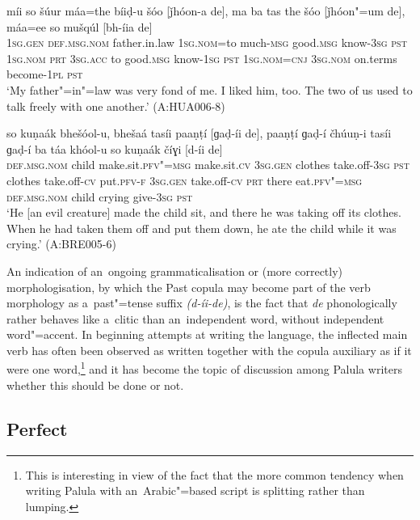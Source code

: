\begin{exe}
\ex
\label{ex:9-20}
\gll míi so šúur máa=the bíiḍ-u šóo [ǰhóon-a de], ma ba tas the šóo [ǰhóon"=um de], máa=ee so mušqúl [bh-íia de] \\
\textsc{1sg.gen} \textsc{def.msg.nom} father.in.law \textsc{1sg.nom=}to much-\textsc{msg} good.\textsc{msg} know-\textsc{3sg} \textsc{pst} \textsc{1sg.nom} \textsc{prt} \textsc{3sg.acc}  to good.\textsc{msg} know-\textsc{1sg } \textsc{pst } \textsc{1sg.nom=cnj}  \textsc{3sg.nom} on.terms become-\textsc{1pl} \textsc{pst} \\
\glt `My father"=in"=law was very fond of me. I liked him, too. The two of us used to talk freely with one another.' (A:HUA006-8)

\ex
\label{ex:9-21}
\gll so kuṇaák bhešóol-u, bhešaá tasíi paaṇṭí [ɡaḍ-íi de], paaṇṭí ɡaḍ-í čhúuṇ-i tasíi ɡaḍ-í ba táa khóol-u so kuṇaák číɣi [d-íi de] \\
\textsc{def.msg.nom} child make.sit.\textsc{pfv"=msg} make.sit.\textsc{cv} \textsc{3sg.gen}  clothes take.off-\textsc{3sg } \textsc{pst} clothes take.off-\textsc{cv} put.\textsc{pfv-f}  \textsc{3sg.gen} take.off-\textsc{cv} \textsc{prt} there eat.\textsc{pfv"=msg}  \textsc{def.msg.nom} child crying give-\textsc{3sg} \textsc{pst} \\
\glt `He [an evil creature] made the child sit, and there he was taking off its clothes. When he had taken them off and put them down, he ate the child while it was crying.' (A:BRE005-6)
\end{exe}

An indication of an~ongoing grammaticalisation or (more correctly) morphologisation, by which the Past copula may become part of the verb morphology as a~past"=tense suffix \textit{(d-íi-de)}, is the fact that \textit{de} phonologically rather behaves like a~clitic than an~independent word, without independent word"=accent. In beginning attempts at writing the language, the inflected main verb has often been observed as written together with the copula auxiliary as if it were one word,\footnote{This is interesting in view of the fact that the more common tendency when writing Palula with an~Arabic"=based script is splitting rather than lumping.} and it has become the topic of discussion among Palula writers whether this should be done or not. 


\subsection{Perfect}
\label{subsec:9-1-7}

